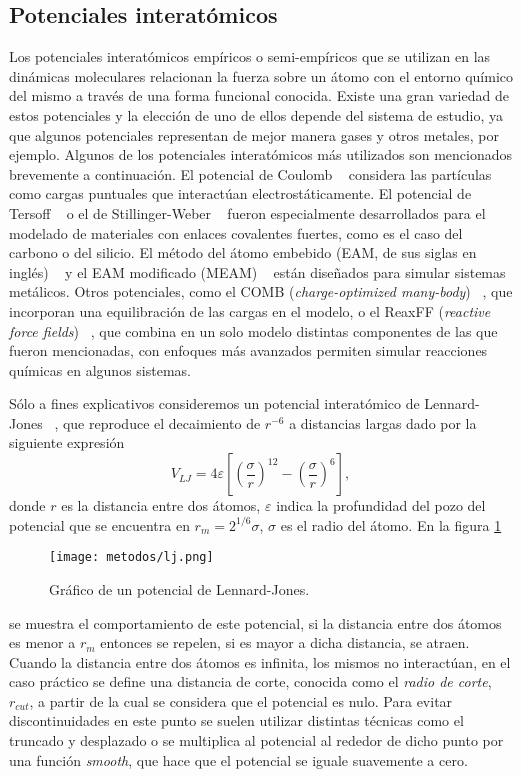 \subsection{Potenciales interatómicos}

Los potenciales interatómicos empíricos o semi-empíricos que se utilizan en las
dinámicas moleculares relacionan la fuerza sobre un átomo con el entorno químico 
del mismo a través de una forma funcional conocida. Existe una gran 
variedad de estos potenciales y la elección de uno de ellos depende del sistema 
de estudio, ya que algunos potenciales representan de mejor manera gases y otros 
metales, por ejemplo. Algunos de los potenciales interatómicos más utilizados
son mencionados brevemente a continuación. El potencial de Coulomb ~\cite{coulomb}
considera las partículas como cargas puntuales que interactúan electrostáticamente. 
El potencial de Tersoff ~\cite{tersoff} o el de Stillinger-Weber 
~\cite{stillinger-weber} fueron especialmente desarrollados para el modelado de 
materiales con enlaces covalentes fuertes, como es el caso del carbono o del 
silicio. El método del átomo embebido (EAM, de sus siglas en inglés) ~\cite{eam} 
y el EAM modificado (MEAM) ~\cite{meam} están diseñados para simular sistemas 
metálicos. Otros potenciales, como el COMB (\textit{charge-optimized many-body}) 
~\cite{comb}, que incorporan una equilibración de las cargas en el modelo, o el 
ReaxFF (\textit{reactive force fields}) ~\cite{reaxff}, que combina en un solo 
modelo distintas componentes de las que fueron mencionadas, con enfoques más 
avanzados permiten simular reacciones químicas en algunos sistemas.

Sólo a fines explicativos consideremos un potencial interatómico de Lennard-Jones
~\cite{lennard-jones}, que reproduce el decaimiento de $r^{-6}$ a distancias 
largas
dado por la siguiente expresión
$$
V_{LJ} = 4\varepsilon \left[ \left( \frac{\sigma}{r} \right)^{12} - \left( \frac{\sigma}{r} \right)^{6} \right],
$$
donde $r$ es la distancia entre dos átomos, $\varepsilon$ indica la profundidad 
del pozo del potencial que se encuentra en $r_m = 2^{1/6} \sigma$, $\sigma$ es el
radio del átomo. En la figura \ref{fig:lj} 
\begin{figure}
    \centering
    \texttt{[image: metodos/lj.png]}
    \caption{Gráfico de un potencial de Lennard-Jones.}
    \label{fig:lj}
\end{figure}
se muestra el comportamiento de este potencial, si la distancia entre dos
átomos es menor a $r_m$ entonces se repelen, si es mayor a dicha distancia, se 
atraen. Cuando la distancia entre dos átomos es infinita, los mismos no 
interactúan, en el caso práctico se define una distancia de corte, conocida como
el \textit{radio de corte}, $r_{cut}$, a partir de la cual se considera que el 
potencial es nulo. Para evitar discontinuidades en este punto se suelen utilizar 
distintas técnicas como el truncado y desplazado o se multiplica al potencial 
al rededor de dicho punto por una función \textit{smooth}, que hace que el 
potencial se iguale suavemente a cero.

